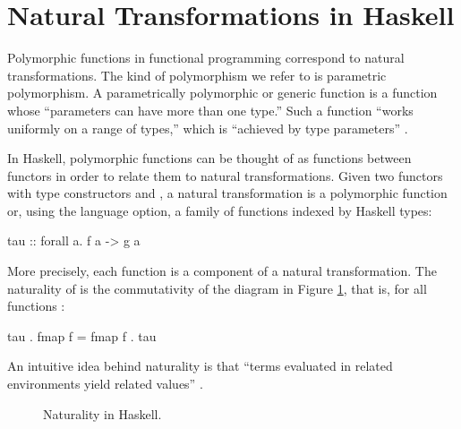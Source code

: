 \section{Natural Transformations in Haskell}
\label{sec:naturals-haskell}

Polymorphic functions in functional programming correspond to natural
transformations. The kind of polymorphism we refer to is parametric
polymorphism. A parametrically polymorphic or generic function is a
function whose ``parameters can have more than one type.'' Such a
function ``works uniformly on a range of types,'' which is ``achieved
by type parameters'' \parencite[476]{cardelli-wegner-1985}.

In Haskell, polymorphic functions can be thought of as functions
between functors in order to relate them to natural transformations.
Given two functors with type constructors  and
, a natural transformation  is a
polymorphic function  or, using the
 language option, a family of functions
indexed by Haskell types:
\begin{codehaskell}
tau :: forall a. f a -> g a
\end{codehaskell}
More precisely, each  function is a component of a
natural transformation. The naturality of  is the
commutativity of the diagram in Figure \ref{fig:naturality-haskell},
that is, for all functions :
\begin{codehaskell}
tau . fmap f = fmap f . tau
\end{codehaskell}
An intuitive idea behind naturality is that ``terms evaluated in
related environments yield related values''
\parencite[347]{wadler-1989}.

\begin{figure}[htb]
  \begin{center}
  \end{center}
  \caption{Naturality in Haskell.}
  \label{fig:naturality-haskell}
\end{figure}

